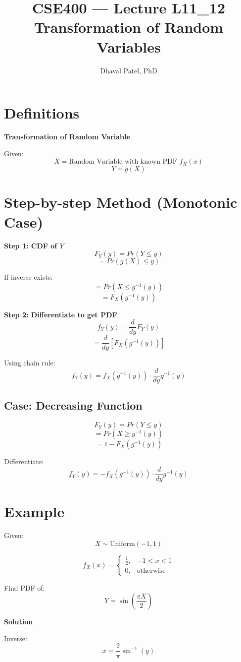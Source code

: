 \documentclass[12pt]{article}
\title{CSE400 --- Lecture L11\_12 \\ Transformation of Random Variables}
\author{Dhaval Patel, PhD}
\date{}
\begin{document}
\maketitle

\section{Definitions}

\textbf{Transformation of Random Variable}

Given:
\[
X = \text{Random Variable with known PDF } f_X(x)
\]
\[
Y = g(X)
\]

\section{Step-by-step Method (Monotonic Case)}

\textbf{Step 1: CDF of $Y$}
\[
F_Y(y) = Pr(Y \le y)
\]
\[
= Pr(g(X) \le y)
\]

If inverse exists:
\[
= Pr(X \le g^{-1}(y))
\]
\[
= F_X(g^{-1}(y))
\]

\textbf{Step 2: Differentiate to get PDF}
\[
f_Y(y) = \frac{d}{dy} F_Y(y)
\]
\[
= \frac{d}{dy}\left[F_X(g^{-1}(y))\right]
\]

Using chain rule:
\[
f_Y(y) = f_X(g^{-1}(y)) \cdot \frac{d}{dy} g^{-1}(y)
\]

\subsection{Case: Decreasing Function}

\[
F_Y(y) = Pr(Y \le y)
\]
\[
= Pr(X \ge g^{-1}(y))
\]
\[
= 1 - F_X(g^{-1}(y))
\]

Differentiate:
\[
f_Y(y) =
- f_X(g^{-1}(y)) \cdot \frac{d}{dy} g^{-1}(y)
\]

\section{Example}

Given:
\[
X \sim \text{Uniform}(-1,1)
\]

\[
f_X(x) =
\begin{cases}
\frac{1}{2}, & -1 < x < 1 \\
0, & \text{otherwise}
\end{cases}
\]

Find PDF of:
\[
Y = \sin\left(\frac{\pi X}{2}\right)
\]

\textbf{Solution}

Inverse:
\[
x = \frac{2}{\pi} \sin^{-1}(y)
\]
\end{document}
